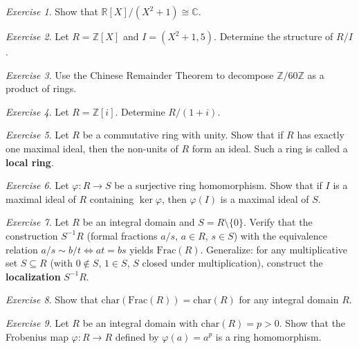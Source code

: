 \documentclass[12pt,a4paper,openany]{book}
\theoremstyle{definition}
\theoremstyle{remark}
\newtheorem{exercise}{Exercise}[chapter]
\begin{document}
\begin{exercise}\label{exo:quot-1}
Show that $\mathbb{R}[X]/(X^2+1)\cong\mathbb{C}$.
\end{exercise}

\begin{exercise}\label{exo:quot-2}
Let $R=\mathbb{Z}[X]$ and $I=(X^2+1,5)$. Determine the structure of $R/I$.
\end{exercise}

\begin{exercise}\label{exo:quot-3}
Use the Chinese Remainder Theorem to decompose $\mathbb{Z}/60\mathbb{Z}$ as a product of rings.
\end{exercise}

\begin{exercise}\label{exo:quot-4}
Let $R=\mathbb{Z}[i]$. Determine $R/(1+i)$.
\end{exercise}

\begin{exercise}\label{exo:quot-5}
Let $R$ be a commutative ring with unity. Show that if $R$ has exactly one maximal ideal, then the non-units of $R$ form an ideal. Such a ring is called a \textbf{local ring}.
\end{exercise}

\begin{exercise}\label{exo:quot-6}
Let $\varphi\colon R\to S$ be a surjective ring homomorphism. Show that if $I$ is a maximal ideal of $R$ containing $\ker\varphi$, then $\varphi(I)$ is a maximal ideal of $S$.
\end{exercise}

\begin{exercise}\label{exo:quot-7}
Let $R$ be an integral domain and $S=R\setminus\{0\}$. Verify that the construction $S^{-1}R$ (formal fractions $a/s$, $a\in R$, $s\in S$) with the equivalence relation $a/s\sim b/t\iff at=bs$ yields $\mathrm{Frac}(R)$. Generalize: for any multiplicative set $S\subseteq R$ (with $0\notin S$, $1\in S$, $S$ closed under multiplication), construct the \textbf{localization} $S^{-1}R$.
\end{exercise}

\begin{exercise}\label{exo:quot-8}
Show that $\mathrm{char}(\mathrm{Frac}(R))=\mathrm{char}(R)$ for any integral domain $R$.
\end{exercise}

\begin{exercise}\label{exo:quot-9}
Let $R$ be an integral domain with $\mathrm{char}(R)=p>0$. Show that the Frobenius map $\varphi\colon R\to R$ defined by $\varphi(a)=a^p$ is a ring homomorphism.
\end{exercise}
\end{document}
